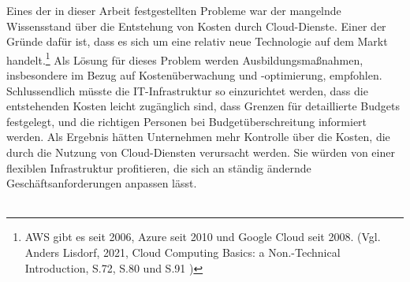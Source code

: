 Eines der in dieser Arbeit festgestellten Probleme war der mangelnde Wissensstand über die Entstehung von Kosten durch Cloud-Dienste. Einer der Gründe dafür ist, dass es sich um eine relativ neue Technologie auf dem Markt handelt.\footnote{AWS gibt es seit 2006, Azure seit 2010 und Google Cloud seit 2008. (Vgl. Anders Lisdorf, 2021, Cloud Computing Basics: a Non.-Technical Introduction, S.72, S.80 und S.91 \cite{CCB})}
Als Lösung für dieses Problem werden Ausbildungsmaßnahmen, insbesondere im Bezug auf Kostenüberwachung und -optimierung, empfohlen. Schlussendlich müsste die IT-Infrastruktur so einzurichtet werden, dass die entstehenden Kosten leicht zugänglich sind, dass Grenzen für detaillierte Budgets festgelegt, und die richtigen Personen bei Budgetüberschreitung informiert werden. Als Ergebnis hätten Unternehmen mehr Kontrolle über die Kosten, die durch die Nutzung von Cloud-Diensten verursacht werden. Sie würden von einer flexiblen Infrastruktur profitieren, die sich an ständig ändernde Geschäftsanforderungen anpassen lässt. 
\\\\
